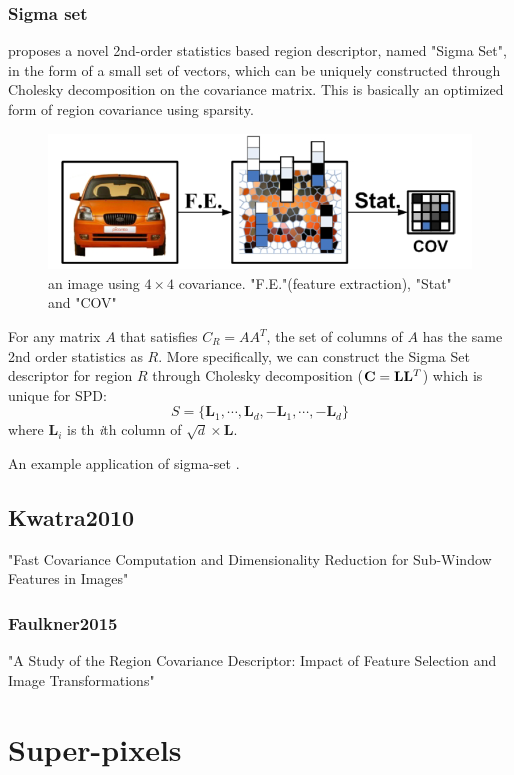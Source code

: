 \subsubsection{Sigma set}\label{sigmaset}
\cite{Chang2009} proposes a novel 2nd-order statistics based region descriptor, named "Sigma Set", in the form of a small set of vectors, which can be uniquely constructed through Cholesky decomposition on the covariance matrix.
This is basically an optimized form of region covariance using sparsity.
\begin{figure}
\centering
\includegraphics[width=0.7\linewidth]{images/sigmaset-fig1}
\caption{an image using $4\times 4$ covariance. "F.E."(feature extraction), "Stat" and "COV"}
\label{fig:sigmaset-fig1}
\end{figure}

For any matrix $A$ that satisfies $C_R=AA^T$, the set of columns of $A$ has the same 2nd order statistics as $R$. More specifically, we can construct the Sigma Set descriptor for region $R$ through Cholesky decomposition ($\mathbf{C} = \mathbf{L}\mathbf{L}^{\tiny{T}}$)  which is unique for SPD:
\begin{equation}
 S = \{\mathbf{L}_1, \cdots, \mathbf{L}_d, \mathbf{-L}_1, \cdots, \mathbf{-L}_d\}
\end{equation}
where $\mathbf{L}_i$ is th \textit{i}th column of $\sqrt{d}\times\mathbf{L}$.

An example application of sigma-set \cite{Uzair2013}.

\subsection{Kwatra2010}
"Fast Covariance Computation and
Dimensionality Reduction for Sub-Window Features in Images"

\subsubsection{Faulkner2015}
\cite{Faulkner2015} "A Study of the Region Covariance Descriptor: Impact of Feature Selection and Image Transformations"

%
%
\newpage
\section{Super-pixels}

